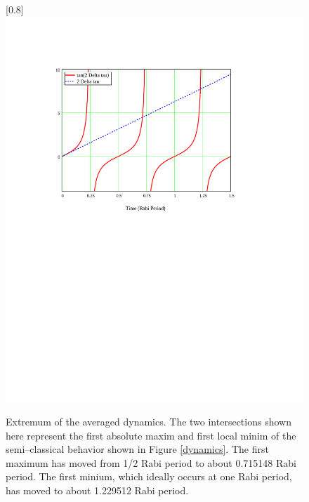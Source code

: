 \begin{figure}
\scalebox{0.8}[0.8]{
\includegraphics[bb=20 400 489 690]
{extremum/extremum.pdf}
}
\caption[Extremum of the orientation averaged dynamics]{Extremum of the averaged dynamics. The two intersections shown here represent the first absolute maxim and first local minim of the semi--classical behavior shown in Figure \ref{dynamics}. The first maximum has moved from 1/2 Rabi period to about 0.715148 Rabi period. The first minium, which ideally occurs at one Rabi period, has moved to about 1.229512 Rabi period.}
\label{extremum}
\end{figure}
